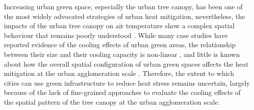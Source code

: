 \documentclass[10pt,letterpaper]{article}
\begin{document}
Increasing urban green space, especially the urban tree canopy, has been one of the most widely advocated strategies of urban heat mitigation, nevertheless, the impacts of the urban tree canopy on air temperature show a complex spatial behaviour that remains poorly understood \cite{bowler2010urban,phelan2015urban,koc2018evaluating}.
While many case studies have reported evidence of the cooling effects of urban green areas, the relationship between their size and their cooling capacity is non-linear \cite{zardo2017estimating}, and little is known about how the overall spatial configuration of urban green spaces affects the heat mitigation at the urban agglomeration scale \cite{lin2013sharing,jim2013sustainable,haaland2015challenges,artmann2019urban}.
Therefore, the extent to which cities can use green infrastructure to reduce heat stress remains uncertain, largely because of the lack of fine-grained approaches to evaluate the cooling effects of the spatial pattern of the tree canopy at the urban agglomeration scale. %
\end{document}
